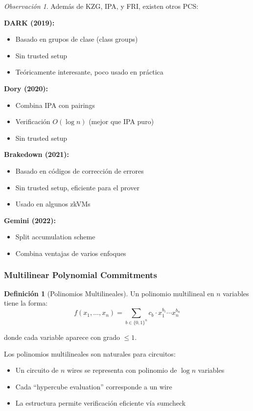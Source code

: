 \documentclass[11pt,a4paper,twoside,openright]{book}
\theoremstyle{definition}
\newtheorem{definition}{Definición}[chapter]
\theoremstyle{plain}
\theoremstyle{remark}
\newtheorem{remark}{Observación}[chapter]
\begin{document}
\begin{remark}
Además de KZG, IPA, y FRI, existen otros PCS:

\textbf{DARK (2019):}
\begin{itemize}
    \item Basado en grupos de clase (class groups)
    \item Sin trusted setup
    \item Teóricamente interesante, poco usado en práctica
\end{itemize}

\textbf{Dory (2020):}
\begin{itemize}
    \item Combina IPA con pairings
    \item Verificación $O(\log n)$ (mejor que IPA puro)
    \item Sin trusted setup
\end{itemize}

\textbf{Brakedown (2021):}
\begin{itemize}
    \item Basado en códigos de corrección de errores
    \item Sin trusted setup, eficiente para el prover
    \item Usado en algunos zkVMs
\end{itemize}

\textbf{Gemini (2022):}
\begin{itemize}
    \item Split accumulation scheme
    \item Combina ventajas de varios enfoques
\end{itemize}
\end{remark}

\subsubsection{Multilinear Polynomial Commitments}

\begin{definition}[Polinomios Multilineales]
Un polinomio multilineal en $n$ variables tiene la forma:
\[ f(x_1, \ldots, x_n) = \sum_{b \in \{0,1\}^n} c_b \cdot x_1^{b_1} \cdots x_n^{b_n} \]

donde cada variable aparece con grado $\leq 1$.
\end{definition}

\begin{intuicion}
Los polinomios multilineales son naturales para circuitos:
\begin{itemize}
    \item Un circuito de $n$ wires se representa con polinomio de $\log n$ variables
    \item Cada ``hypercube evaluation'' corresponde a un wire
    \item La estructura permite verificación eficiente vía sumcheck
\end{itemize}
\end{intuicion}
\end{document}
